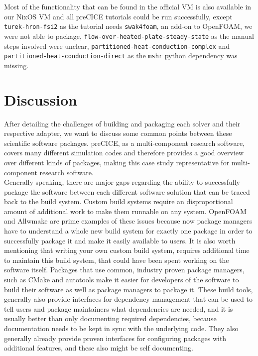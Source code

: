 \documentclass{eceasst}
\begin{document}
\begin{sloppypar}
Most of the functionality that can be found in the official VM is also available in our NixOS VM and all preCICE tutorials could be run successfully, except \texttt{turek-hron-fsi2} as the tutorial needs \texttt{swak4foam}, an add-on to OpenFOAM, we were not able to package, \texttt{flow-over-heated-plate-steady-state} as the manual steps involved were unclear, \texttt{partitioned-heat-conduction-complex} and \texttt{partitioned-heat-conduction-direct} as the \texttt{mshr} python dependency was missing.
\end{sloppypar}

\section{Discussion}

After detailing the challenges of building and packaging each solver and their respective adapter, we want to discuss some common points between these scientific software packages.
preCICE, as a multi-component research software, covers many different simulation codes and therefore provides a good overview over different kinds of packages, making this case study representative for multi-component research software.\\

Generally speaking, there are major gaps regarding the ability to successfully package the software between each different software solution that can be traced back to the build system.
Custom build systems require an disproportional amount of additional work to make them runnable on any system.
OpenFOAM and Allwmake are prime examples of these issues because now package managers have to understand a whole new build system for exactly one package in order to successfully package it and make it easily available to users.
It is also worth mentioning that writing your own custom build system, requires additional time to maintain this build system, that could have been spent working on the software itself.
Packages that use common, industry proven package managers, such as CMake and autotools make it easier for developers of the software to build their software as well as package managers to package it.
These build tools, generally also provide interfaces for dependency management that can be used to tell users and package maintainers what dependencies are needed, and it is usually better than only documenting required dependencies, because documentation needs to be kept in sync with the underlying code.
They also generally already provide proven interfaces for configuring packages with additional features, and these also might be self documenting.
\end{document}
